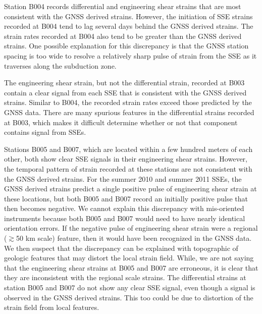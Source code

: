 Station B004 records differential and engineering shear strains that
are most consistent with the GNSS derived strains. However, the
initiation of SSE strains recorded at B004 tend to lag several days
behind the GNSS derived strains. The strain rates recorded at B004
also tend to be greater than the GNSS derived strains. One possible
explanation for this discrepancy is that the GNSS station spacing is
too wide to resolve a relatively sharp pulse of strain from the SSE as
it traverses along the subduction zone.

The engineering shear strain, but not the differential strain,
recorded at B003 contain a clear signal from each SSE that is
consistent with the GNSS derived strains. Similar to B004, the
recorded strain rates exceed those predicted by the GNSS data. There
are many spurious features in the differential strains recorded at
B003, which makes it difficult determine whether or not that component
contains signal from SSEs.

Stations B005 and B007, which are located within a few hundred meters
of each other, both show clear SSE signals in their engineering shear
strains.  However, the temporal pattern of strain recorded at these
stations are not consistent with the GNSS derived strains.  For the
summer 2010 and summer 2011 SSEs, the GNSS derived strains predict a
single positive pulse of engineering shear strain at these locations,
but both B005 and B007 record an initially positive pulse that then
becomes negative. We cannot explain this discrepancy with mis-oriented
instruments because both B005 and B007 would need to have nearly
identical orientation errors. If the negative pulse of engineering
shear strain were a regional ($\gtrsim$50 km scale) feature, then it
would have been recognized in the GNSS data. We then suspect that the
discrepancy can be explained with topographic of geologic features
that may distort the local strain field. While, we are not saying that
the engineering shear strains at B005 and B007 are erroneous, it is
clear that they are inconsistent with the regional scale strains. The
differential strains at station B005 and B007 do not show any clear
SSE signal, even though a signal is observed in the GNSS derived
strains. This too could be due to distortion of the strain field from
local features.

